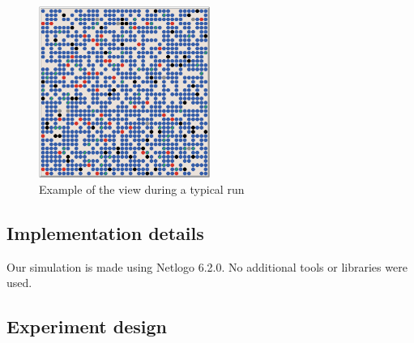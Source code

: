 \documentclass[a4paper,11pt]{article}
\begin{document}
\begin{figure}[h]
    \centering
    \includegraphics[width = 0.5\textwidth]{ViewExample.PNG}
    \caption{Example of the view during a typical run}
    \label{fig:example}
\end{figure}

\subsection{Implementation details}

Our simulation is made using Netlogo 6.2.0. No additional tools or libraries were used.

\subsection{Experiment design}
\end{document}
